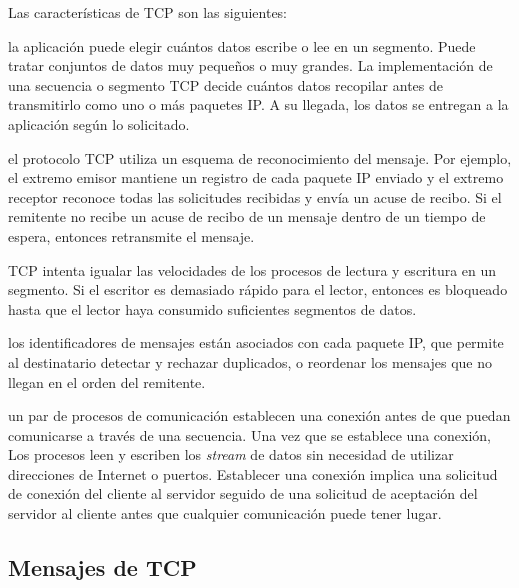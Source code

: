 Las  características de TCP son las siguientes:
\begin{description}    
	\item[Tamaños de mensaje:]   la aplicación puede elegir cuántos datos escribe o lee en un segmento. Puede tratar conjuntos de datos muy pequeños o muy grandes. La implementación de una secuencia o segmento TCP decide cuántos datos recopilar antes de  transmitirlo como uno o más paquetes IP. A su llegada, los datos se entregan a la aplicación según lo solicitado.   
	
	\item [Mensajes perdidos:] el protocolo TCP utiliza un esquema de reconocimiento del mensaje. Por ejemplo,  el extremo emisor mantiene un registro de cada paquete IP enviado y el extremo receptor reconoce todas las solicitudes recibidas y envía un acuse de recibo. Si el remitente  no recibe un acuse de recibo de un mensaje dentro de un tiempo de espera, entonces  retransmite el mensaje.  
	
	\item [Control de flujo:] TCP intenta igualar las velocidades de los procesos de lectura y escritura en un segmento. Si el escritor es demasiado rápido para el lector, entonces es 	bloqueado hasta que el lector haya consumido suficientes segmentos de datos. 
	
	\item [Duplicación y ordenamiento de mensajes:] los identificadores de mensajes están asociados con cada paquete IP, que permite al destinatario detectar y rechazar duplicados, o reordenar los	mensajes que no llegan en el orden del remitente. 
	
	\item[Destinos de mensajes:]   un par de procesos de comunicación establecen una conexión antes de que puedan comunicarse a través de una secuencia. Una vez que se establece una conexión, 	Los procesos  leen y escriben los \textit{stream} de datos sin necesidad de utilizar 	direcciones  de Internet o puertos. Establecer una conexión implica una solicitud de conexión del cliente al servidor seguido de una solicitud de aceptación del servidor al cliente antes que cualquier comunicación puede tener lugar.  	
\end{description}

\subsection{Mensajes de TCP}

